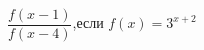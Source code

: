 \begin{ex}[type=calculate_expression]
	\begin{condition}
		\( \dfrac{f(x-1)}{f(x-4)} \),\quad если \( f(x)=3^{x+2} \)
	\end{condition}
\end{ex}